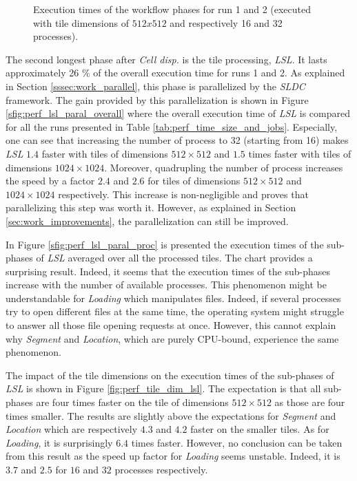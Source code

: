 \begin{figure}
	\caption{Execution times of the workflow phases for run 1 and 2 (executed with tile dimensions of $512x512$ and respectively 16 and 32 processes).}
	\label{fig:exec_time_work_phase_r1_2}
\end{figure}

The second longest phase after \textit{Cell disp.} is the tile processing, \textit{LSL}. It lasts approximately 26 \% of the overall execution time for runs 1 and 2. As explained in Section \ref{sssec:work_parallel}, this phase is parallelized by the \textit{SLDC} framework. The gain provided by this parallelization is shown in Figure \ref{sfig:perf_lsl_paral_overall} where the overall execution time of \textit{LSL} is compared for all the runs presented in Table \ref{tab:perf_time_size_and_jobs}. Especially, one can see that increasing the number of process to  32 (starting from 16) makes \textit{LSL} $1.4$ faster with tiles of dimensions $512\times 512$ and $1.5$ times faster with tiles of dimensions $1024\times 1024$. Moreover, quadrupling the number of process increases the speed by a factor $2.4$ and $2.6$ for tiles of dimensions $512 \times 512$ and $1024 \times 1024$ respectively. This increase is non-negligible and proves that parallelizing this step was worth it. However, as explained in Section \ref{sec:work_improvements}, the parallelization can still be improved. 

In Figure \ref{sfig:perf_lsl_paral_proc} is presented the execution times of the sub-phases of \textit{LSL} averaged over all the processed tiles. The chart provides a surprising result. Indeed, it seems that the execution times of the sub-phases increase with the number of available processes. This phenomenon might be understandable for \textit{Loading} which manipulates files. Indeed, if several processes try to open different files at the same time, the operating system might struggle to answer all those file opening requests at once. However, this cannot explain why \textit{Segment} and \textit{Location}, which are purely CPU-bound, experience the same phenomenon.

The impact of the tile dimensions on the execution times of the sub-phases of \textit{LSL} is shown in Figure \ref{fig:perf_tile_dim_lsl}. The expectation is that all sub-phases are four times faster on the tile of dimensions $512\times 512$ as those are four times smaller. The results are slightly above the expectations for \textit{Segment} and \textit{Location} which are respectively $4.3$ and $4.2$ faster on the smaller tiles. As for \textit{Loading}, it is surprisingly $6.4$ times faster. However, no conclusion can be taken from this result as the speed up factor for \textit{Loading} seems unstable. Indeed, it is $3.7$ and $2.5$ for $16$ and $32$ processes respectively. 

